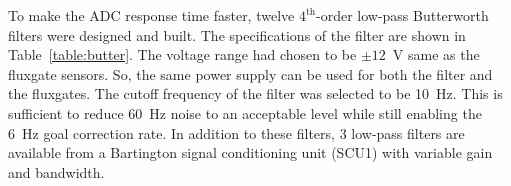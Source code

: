 To make the ADC response time faster, twelve $\mathrm{4^{th}}$-order low-pass Butterworth filters were designed and built. The specifications of the filter are shown in Table~\ref{table:butter}. The voltage range had chosen to be $\pm12$~V same as the fluxgate sensors. So, the same power supply can be used for both the filter and the fluxgates. The cutoff frequency of the filter was selected to be 10~Hz. This is sufficient to reduce 60~Hz noise to an acceptable level while still enabling the 6~Hz goal correction rate. In addition to these filters, 3 low-pass filters are available from a Bartington signal conditioning unit (SCU1) with variable gain and bandwidth.


